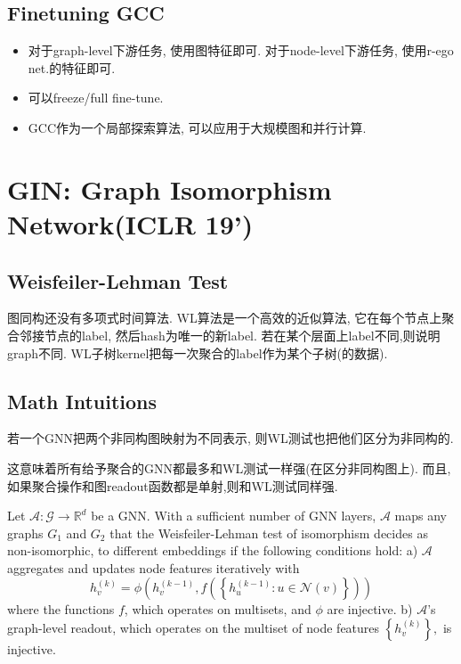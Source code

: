 \documentclass{article}
\begin{document}
\subsection{Finetuning GCC}
\begin{flushleft}
\begin{itemize}
    \item 对于graph-level下游任务, 使用图特征即可. 对于node-level下游任务, 使用r-ego net.的特征即可.
    \item 可以freeze/full fine-tune.
    \item GCC作为一个局部探索算法, 可以应用于大规模图和并行计算.
\end{itemize}
\end{flushleft}

\section{GIN: Graph Isomorphism Network(ICLR 19')}

\subsection{Weisfeiler-Lehman Test}
图同构还没有多项式时间算法. WL算法是一个高效的近似算法, 它在每个节点上聚合邻接节点的label, 然后hash为唯一的新label. 若在某个层面上label不同,则说明graph不同. WL子树kernel把每一次聚合的label作为某个子树(的数据).

\subsection{Math Intuitions}

\begin{lemma}
    若一个GNN把两个非同构图映射为不同表示, 则WL测试也把他们区分为非同构的.
\end{lemma}

这意味着所有给予聚合的GNN都最多和WL测试一样强(在区分非同构图上). 而且, 如果聚合操作和图readout函数都是单射,则和WL测试同样强.

\begin{theorem}
    Let $\mathcal{A}: \mathcal{G} \rightarrow \mathbb{R}^{d}$ be a GNN. With a sufficient number of GNN layers, $\mathcal{A}$ maps any graphs $G_{1}$ and $G_{2}$ that the Weisfeiler-Lehman test of isomorphism decides as non-isomorphic, to different embeddings if the following conditions hold:
    a) $\mathcal{A}$ aggregates and updates node features iteratively with
    $$
    h_{v}^{(k)}=\phi\left(h_{v}^{(k-1)}, f\left(\left\{h_{u}^{(k-1)}: u \in \mathcal{N}(v)\right\}\right)\right)
    $$
    where the functions $f$, which operates on multisets, and $\phi$ are injective.
    b) $\mathcal{A}$'s graph-level readout, which operates on the multiset of node features $\left\{h_{v}^{(k)}\right\},$ is injective.
\end{theorem}
\end{document}
